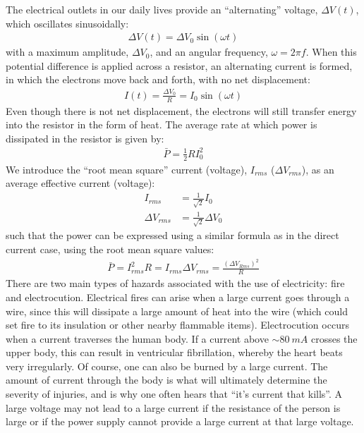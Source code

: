 \begin{chapterSummary}
The electrical outlets in our daily lives provide an ``alternating'' voltage, $\Delta V(t)$, which oscillates sinusoidally:
\begin{align*}
\Delta V(t)=\Delta V_0\sin(\omega t)
\end{align*}
with a maximum amplitude, $\Delta V_0$, and an angular frequency, $\omega = 2\pi f$. When this potential difference is applied across a resistor, an alternating current is formed, in which the electrons move back and forth, with no net displacement:
\begin{align*}
I(t)=\frac{\Delta V_0}{R}=I_0\sin(\omega t)
\end{align*}
Even though there is not net displacement, the electrons will still transfer energy into the resistor in the form of heat. The average rate at which power is dissipated in the resistor is given by:
\begin{align*}
\bar P=\frac{1}{2}RI_0^2
\end{align*}
We introduce the ``root mean square'' current (voltage), $I_{rms}$ ($\Delta V_{rms}$), as an average effective current (voltage):
\begin{align*}
I_{rms}&=\frac{1}{\sqrt 2}I_0\\
\Delta V_{rms}&=\frac{1}{\sqrt 2}\Delta V_0
\end{align*}
such that the power can be expressed using a similar formula as in the direct current case, using the root mean square values:
\begin{align*}
\bar P = I_{rms}^2R = I_{rms}\Delta V_{rms}=\frac{(\Delta V_{Rms})^2}{R}
\end{align*}
There are two main types of hazards associated with the use of electricity: fire and electrocution. Electrical fires can arise when a large current goes through a wire, since this will dissipate a large amount of heat into the wire (which could set fire to its insulation or other nearby flammable items). Electrocution occurs when a current traverses the human body. If a current above $\sim\SI{80}{mA}$ crosses the upper body, this can result in ventricular fibrillation, whereby the heart beats very irregularly. Of course, one can also be burned by a large current. The amount of current through the body is what will ultimately determine the severity of injuries, and is why one often hears that ``it's current that kills''. A large voltage may not lead to a large current if the resistance of the person is large or if the power supply cannot provide a large current at that large voltage.
\end{chapterSummary}

